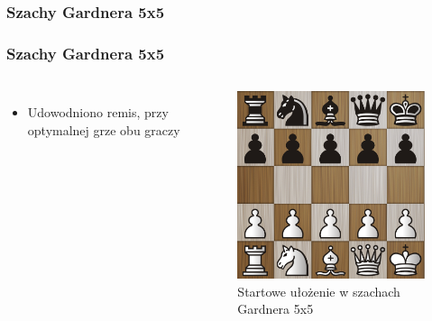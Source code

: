 \documentclass[polish,envcountsect,10pt]{beamer}
\begin{document}
            \subsubsection{Szachy Gardnera 5x5}
                \begin{frame}
                    \frametitle{Szachy Gardnera 5x5}
                    \begin{columns}
                        \begin{itemize}
                            \item Udowodniono remis, przy optymalnej grze obu graczy \cite{minichess}
                        \end{itemize}
                            \begin{figure}[H]
                                \centering
                                \includegraphics[width=\textwidth]{images/gardner.png}
                                \caption{Startowe ułożenie w szachach Gardnera 5x5}
                            \end{figure}    
                    \end{columns}
                \end{frame}
\end{document}
